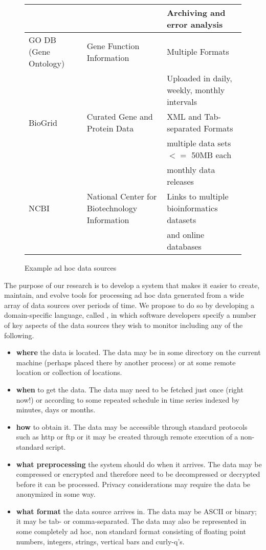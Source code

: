 \begin{figure*}
\begin{center}
\begin{tabular}{|l|l|l|}
                 &                          & Archiving and error analysis\\\hline
GO DB (Gene Ontology)~\cite{geneontology} & Gene Function Information & Multiple Formats \\
                                             && Uploaded in daily, weekly, monthly intervals \\\hline
BioGrid~\cite{biogrid} & Curated Gene and Protein Data & XML and Tab-separated Formats \\
          & & multiple data sets $<=$ 50MB each \\
          & & monthly data releases \\\hline
NCBI~\cite{ncbi} & National Center for Biotechnology Information & Links to multiple bioinformatics datasets \\
                                                     && and online databases\\
\hline\hline
\end{tabular}
\end{center}
\caption{Example ad hoc data sources}
\label{fig:exampledata}
\end{figure*}

The purpose of our research is to develop a system that makes it
easier to create, maintain, and evolve tools for processing ad hoc data
generated from a wide array of data sources over periods of time.    
We propose to do so by developing a
domain-specific language, called \padsd, in which software developers
specify a number of key aspects of the data sources they wish to
monitor including any of the following.

\begin{itemize}
\item {\bf where} the data is located.  The data may be in some directory
on the current machine (perhaps placed there by another process) or at some 
remote location or collection of locations.
\item {\bf when} to get the data.  The data may need to be fetched just 
once (right now!) or according to some repeated schedule in time series 
indexed by minutes, days or months.
\item {\bf how} to obtain it.  The data may be accessible through standard 
protocols such as http or ftp or it may be created through remote execution 
of a non-standard script. 
\item {\bf what preprocessing} the system should do when it arrives.  The 
data may be compressed or encrypted and therefore need to be decompressed 
or decrypted before it can be processed.  Privacy considerations may require 
the data be anonymized in some way.
\item {\bf what format} the data source arrives in.  The data may be ASCII 
or binary; it may be tab- or comma-separated.  The data may also be 
represented in some completely ad hoc, non standard format consisting of 
floating point numbers, integers, strings, vertical bars and curly-q's.  
\end{itemize}

